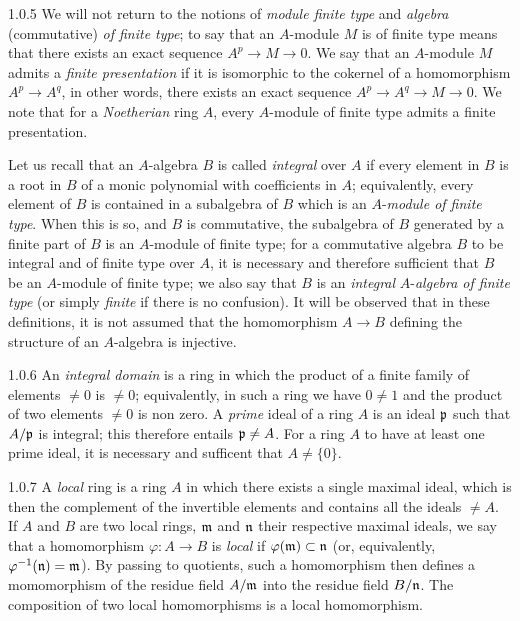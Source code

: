 \documentclass[../main.tex]{subfiles}
\begin{document}
\begin{env}{1.0.5}
We will not return to the notions of \emph{module finite type} and
\emph{algebra} (commutative) \emph{of finite type}; to say that an $A$-module $M$
is of finite type means that there exists an exact sequence $A^p\to M\to 0$. We say that
an $A$-module $M$ admits a \emph{finite presentation} if it is isomorphic to the cokernel
of a homomorphism $A^p\to A^q$, in other words, there exists an exact sequence
$A^p\to A^q\to M\to 0$. We note that for a \emph{Noetherian} ring $A$, every $A$-module
of finite type admits a finite presentation.

Let us recall that an $A$-algebra $B$ is called \emph{integral} over $A$ if every element
in $B$ is a root in $B$ of a monic polynomial with coefficients in $A$; equivalently, every
element of $B$ is contained in a subalgebra of $B$ which is an $A$-\emph{module of finite type}.
When this is so, and $B$ is commutative, the subalgebra of $B$ generated by a finite part of
$B$ is an $A$-module of finite type; for a commutative algebra $B$ to be integral and of finite
type over $A$, it is necessary and therefore sufficient that $B$ be an $A$-module of finite
type; we also say that $B$ is an \emph{integral} $A$-\emph{algebra of finite type} (or
simply \emph{finite} if there is no confusion). It will be observed that in these definitions,
it is not assumed that the homomorphism $A\to B$ defining the structure of an $A$-algebra
is injective.
\end{env}

\begin{env}{1.0.6}
An \emph{integral domain} is a ring in which the product of a finite family of elements
$\neq 0$ is $\neq 0$; equivalently, in such a ring we have $0\neq 1$ and the product of
two elements $\neq 0$ is non zero. A \emph{prime} ideal of a ring $A$ is an ideal $\mathfrak{p}$
such that $A/\mathfrak{p}$ is integral; this therefore entails $\mathfrak{p}\neq A$. For a ring $A$ to
have at least one prime ideal, it is necessary and sufficent that $A\neq\{0\}$.
\end{env}

\begin{env}{1.0.7}
A \emph{local} ring is a ring $A$ in which there exists a single maximal ideal, which is then
the complement of the invertible elements and contains all the ideals $\neq A$. If $A$ and $B$
are two local rings, $\mathfrak{m}$ and $\mathfrak{n}$ their respective maximal ideals, we say that a
homomorphism $\varphi:A\to B$ is \emph{local} if $\varphi(\mathfrak{m})\subset\mathfrak{n}$ (or, equivalently,
$\varphi^{-1}(\mathfrak{n})=\mathfrak{m}$). By passing to quotients, such a homomorphism then defines
a momomorphism of the residue field $A/\mathfrak{m}$ into the residue field $B/\mathfrak{n}$. The
composition of two local homomorphisms is a local homomorphism.
\end{env}
\end{document}
